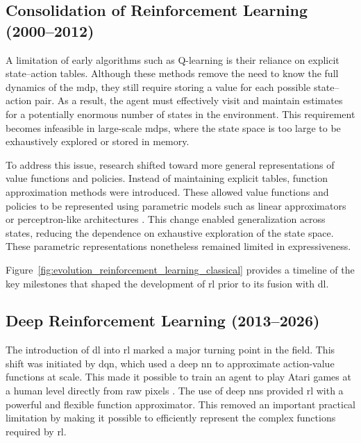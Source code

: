 \subsection{Consolidation of Reinforcement Learning (2000--2012)}

A limitation of early algorithms such as Q-learning is their reliance on explicit state–action tables. 
Although these methods remove the need to know the full dynamics of the \gls{mdp}, they still require storing a value for each possible state–action pair. 
As a result, the agent must effectively visit and maintain estimates for a potentially enormous number of states in the environment. 
This requirement becomes infeasible in large-scale \glspl{mdp}, where the state space is too large to be exhaustively explored or stored in memory.

To address this issue, research shifted toward more general representations of value functions and policies. 
Instead of maintaining explicit tables, function approximation methods were introduced.  
These allowed value functions and policies to be represented using parametric models such as linear approximators or perceptron-like architectures \parencite{BartoSuttonAnderson1983, tsitsiklis1996analysis}.
This change enabled generalization across states, reducing the dependence on exhaustive exploration of the state space.
These parametric representations nonetheless remained limited in expressiveness.

Figure~\ref{fig:evolution_reinforcement_learning_classical} provides a timeline of the key milestones that shaped the development of \gls{rl} prior to its fusion with \gls{dl}.



\subsection{Deep Reinforcement Learning (2013--2026)}

The introduction of \gls{dl} into \gls{rl} marked a major turning point in the field.
This shift was initiated by \gls{dqn}, which used a deep \gls{nn} to approximate action-value functions at scale.
This made it possible to train an agent to play Atari games at a human level directly from raw pixels \parencite{mnih2013playingatarideepreinforcement}.
The use of deep \glspl{nn} provided \gls{rl} with a powerful and flexible function approximator.
This removed an important practical limitation by making it possible to efficiently represent the complex functions required by \gls{rl}.


